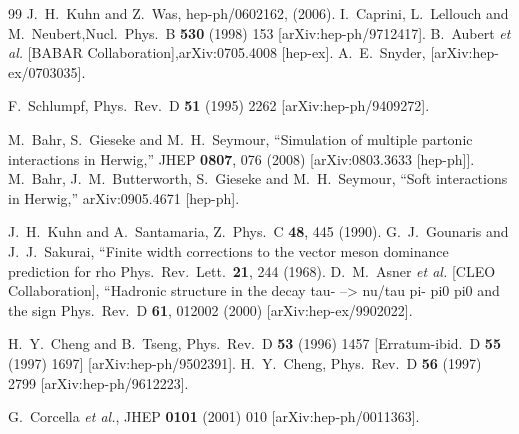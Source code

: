 \documentclass{article}
\begin{document}
\begin{thebibliography}{99}
 J.~H.~Kuhn and Z.~Was, hep-ph/0602162, (2006).
 I.~Caprini, L.~Lellouch and M.~Neubert,Nucl.\ Phys.\  B {\bf 530} (1998) 153 [arXiv:hep-ph/9712417].
 B.~Aubert {\it et al.}  [BABAR Collaboration],arXiv:0705.4008 [hep-ex]. %
 A.~E.~Snyder, [arXiv:hep-ex/0703035].

F.~Schlumpf,
Phys.\ Rev.\  D {\bf 51} (1995) 2262 [arXiv:hep-ph/9409272].

  M.~Bahr, S.~Gieseke and M.~H.~Seymour,
  ``Simulation of multiple partonic interactions in Herwig,''
  JHEP {\bf 0807}, 076 (2008)
  [arXiv:0803.3633 [hep-ph]].
  M.~Bahr, J.~M.~Butterworth, S.~Gieseke and M.~H.~Seymour,
  ``Soft interactions in Herwig,''
  arXiv:0905.4671 [hep-ph].

  J.~H.~Kuhn and A.~Santamaria,
  Z.\ Phys.\  C {\bf 48}, 445 (1990).
  G.~J.~Gounaris and J.~J.~Sakurai,
   ``Finite width corrections to the vector meson dominance prediction for rho
  Phys.\ Rev.\ Lett.\  {\bf 21}, 244 (1968).
  D.~M.~Asner {\it et al.}  [CLEO Collaboration],
   ``Hadronic structure in the decay tau- --> nu/tau pi- pi0 pi0 and the  sign
  Phys.\ Rev.\  D {\bf 61}, 012002 (2000)
  [arXiv:hep-ex/9902022].

  H.~Y.~Cheng and B.~Tseng,
  Phys.\ Rev.\  D {\bf 53} (1996) 1457
  [Erratum-ibid.\  D {\bf 55} (1997) 1697]
  [arXiv:hep-ph/9502391].
  H.~Y.~Cheng,
  Phys.\ Rev.\  D {\bf 56} (1997) 2799
  [arXiv:hep-ph/9612223].

  G.~Corcella {\it et al.},
  JHEP {\bf 0101} (2001) 010
  [arXiv:hep-ph/0011363].


\end{thebibliography}
\end{document}
